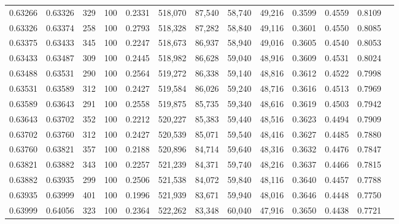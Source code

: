 \begin{tabular}{rrrrrrrrrrrrr}
0.63266 & 0.63326 &   329 & 100 &                                     0.2331 & 518,070 &  87,540 &  58,740 &  49,216 & 0.3599 & 0.4559 & 0.8109 \\
0.63326 & 0.63374 &   258 & 100 &                                     0.2793 & 518,328 &  87,282 &  58,840 &  49,116 & 0.3601 & 0.4550 & 0.8085 \\
0.63375 & 0.63433 &   345 & 100 &                                     0.2247 & 518,673 &  86,937 &  58,940 &  49,016 & 0.3605 & 0.4540 & 0.8053 \\
0.63433 & 0.63487 &   309 & 100 &                                     0.2445 & 518,982 &  86,628 &  59,040 &  48,916 & 0.3609 & 0.4531 & 0.8024 \\
0.63488 & 0.63531 &   290 & 100 &                                     0.2564 & 519,272 &  86,338 &  59,140 &  48,816 & 0.3612 & 0.4522 & 0.7998 \\
0.63531 & 0.63589 &   312 & 100 &                                     0.2427 & 519,584 &  86,026 &  59,240 &  48,716 & 0.3616 & 0.4513 & 0.7969 \\
0.63589 & 0.63643 &   291 & 100 &                                     0.2558 & 519,875 &  85,735 &  59,340 &  48,616 & 0.3619 & 0.4503 & 0.7942 \\
0.63643 & 0.63702 &   352 & 100 &                                     0.2212 & 520,227 &  85,383 &  59,440 &  48,516 & 0.3623 & 0.4494 & 0.7909 \\
0.63702 & 0.63760 &   312 & 100 &                                     0.2427 & 520,539 &  85,071 &  59,540 &  48,416 & 0.3627 & 0.4485 & 0.7880 \\
0.63760 & 0.63821 &   357 & 100 &                                     0.2188 & 520,896 &  84,714 &  59,640 &  48,316 & 0.3632 & 0.4476 & 0.7847 \\
0.63821 & 0.63882 &   343 & 100 &                                     0.2257 & 521,239 &  84,371 &  59,740 &  48,216 & 0.3637 & 0.4466 & 0.7815 \\
0.63882 & 0.63935 &   299 & 100 &                                     0.2506 & 521,538 &  84,072 &  59,840 &  48,116 & 0.3640 & 0.4457 & 0.7788 \\
0.63935 & 0.63999 &   401 & 100 &                                     0.1996 & 521,939 &  83,671 &  59,940 &  48,016 & 0.3646 & 0.4448 & 0.7750 \\
0.63999 & 0.64056 &   323 & 100 &                                     0.2364 & 522,262 &  83,348 &  60,040 &  47,916 & 0.3650 & 0.4438 & 0.7721 \\

\end{tabular}
